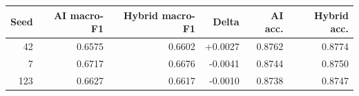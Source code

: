 ﻿\begin{tabular}{rrrrrr}
\toprule
Seed & AI macro-F1 & Hybrid macro-F1 & Delta & AI acc. & Hybrid acc. \\
\midrule
42 & 0.6575 & 0.6602 & +0.0027 & 0.8762 & 0.8774 \\
7 & 0.6717 & 0.6676 & -0.0041 & 0.8744 & 0.8750 \\
123 & 0.6627 & 0.6617 & -0.0010 & 0.8738 & 0.8747 \\
\bottomrule
\end{tabular}
